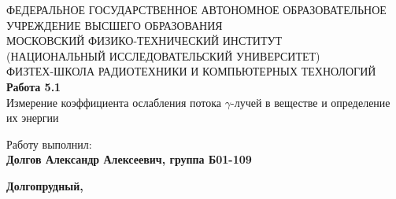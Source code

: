 \begin{titlepage}
    \begin{center}
        {\small ФЕДЕРАЛЬНОЕ ГОСУДАРСТВЕННОЕ АВТОНОМНОЕ ОБРАЗОВАТЕЛЬНОЕ\\
                УЧРЕЖДЕНИЕ ВЫСШЕГО ОБРАЗОВАНИЯ\\
                МОСКОВСКИЙ ФИЗИКО-ТЕХНИЧЕСКИЙ ИНСТИТУТ\\
                (НАЦИОНАЛЬНЫЙ ИССЛЕДОВАТЕЛЬСКИЙ УНИВЕРСИТЕТ)\\
                ФИЗТЕХ-ШКОЛА РАДИОТЕХНИКИ И КОМПЬЮТЕРНЫХ ТЕХНОЛОГИЙ}\\
        \vfill
        \Huge{\textbf{Работа 5.1}\\
              Измерение коэффициента ослабления потока $\gamma$-лучей в веществе и определение их
              энергии}\\
    \end{center}

    \vfill

    \begin{flushright}
        \normalsize{Работу выполнил:}\\
        \normalsize{\textbf{Долгов Александр Алексеевич, группа Б01-109}}\\
    \end{flushright}

    \vspace*{\fill} %

    \begin{center}
        \normalsize{\textbf{Долгопрудный, \the\year{}}}
    \end{center}
\end{titlepage}
